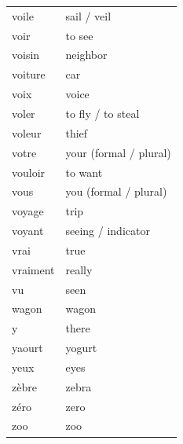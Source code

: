\documentclass[12pt,a4paper]{article}
\begin{document}
\begin{longtable}{p{4cm} p{6cm}}
voile & sail / veil \\
voir & to see \\
voisin & neighbor \\
voiture & car \\
voix & voice \\
voler & to fly / to steal \\
voleur & thief \\
votre & your (formal / plural) \\
vouloir & to want \\
vous & you (formal / plural) \\
voyage & trip \\
voyant & seeing / indicator \\
vrai & true \\
vraiment & really \\
vu & seen \\
wagon & wagon \\
y & there \\
yaourt & yogurt \\
yeux & eyes \\
zèbre & zebra \\
zéro & zero \\
zoo & zoo \\
\bottomrule
\end{longtable}
\end{document}
